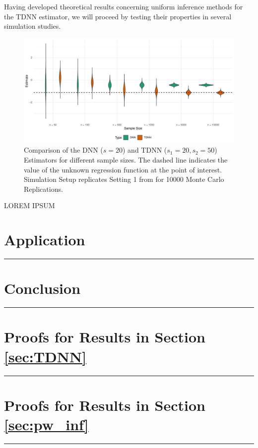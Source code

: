 \documentclass[letterpaper,10pt]{article}
\numberwithin{equation}{section}
\numberwithin{thm}{section}
\numberwithin{lem}{section}
\numberwithin{cor}{section}
\newcommand{\1}{\mathbbm{1}}
\begin{document}
Having developed theoretical results concerning uniform inference methods for the TDNN estimator, we will proceed by testing their properties in several simulation studies.

\begin{figure}[H]
	\includegraphics[width = \textwidth]{../Code/Simulations/Graphics/TDNN_DNN.pdf}
	\caption{Comparison of the DNN ($s = 20$) and TDNN ($s_1 = 20, s_2 = 50$) Estimators for different sample sizes.
		The dashed line indicates the value of the unknown regression function at the point of interest.
		Simulation Setup replicates Setting 1 from \citet{demirkaya_optimal_2024} for 10000 Monte Carlo Replications.}
\end{figure}

{\color{red} LOREM IPSUM}


\section{Application}\label{Application}
\hrule

\section{Conclusion}\label{Conclusion}
\hrule

\newpage
\printbibliography

\newpage
\appendix

\newpage
\section{Proofs for Results in Section \ref{sec:TDNN}}
\hrule

\newpage
\section{Proofs for Results in Section \ref{sec:pw_inf}}
\hrule
\end{document}
